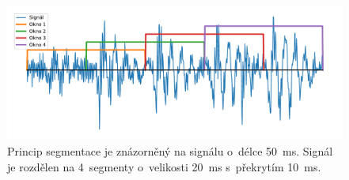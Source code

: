 \begin{figure}[ht]
  \centering
  \includegraphics[width=\linewidth]{obrazky-figures/segmentation.pdf}
  \caption{Princip segmentace je znázorněný na signálu o~délce 50~ms. Signál je rozdělen na 4~segmenty o~velikosti 20~ms s~překrytím 10~ms.}
  \label{fig:Segmentation}
\end{figure}

